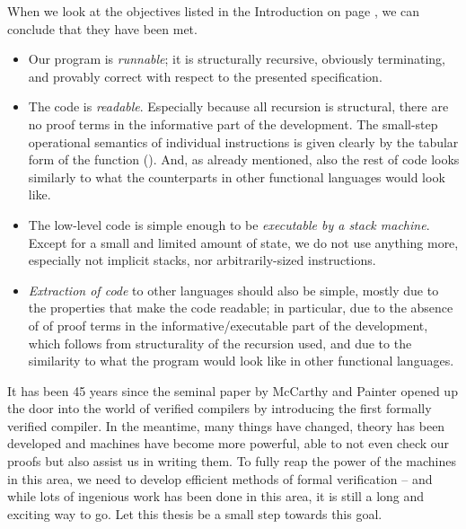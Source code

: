 When we look at the objectives listed in the Introduction on page \pageref{objectives},
we can conclude that they have been met.
\begin{itemize}
	\item Our program is \emph{runnable}; it is structurally recursive,
		obviously terminating, and provably correct with respect to the presented
		specification.
		
	\item The code is \emph{readable}. Especially because all recursion is structural,
		there are no proof terms in the
		informative part of the development. The small-step operational semantics
		of individual instructions is given clearly by the tabular form of the function
		 (). And, as already mentioned,
		also the rest of code looks similarly to what the counterparts in other functional
		languages would look like.
		
	\item The low-level code is simple enough to be \emph{executable by a stack machine}.
		Except for a small and limited amount of state, we do not use anything more,
		especially not implicit stacks, nor arbitrarily-sized instructions.
		
	\item \emph{Extraction of code} to other languages should also be simple, mostly due to
		the properties that make the code readable; in particular, due to the absence of
		of proof terms in the informative/executable part of the development, which follows
		from structurality of the recursion used, and due to the similarity to what
		the program would look like in other functional languages.
\end{itemize}

It has been 45 years since the seminal paper by McCarthy and Painter \cite{mccarthy67}
opened up the door into the world of verified compilers by introducing the first formally
verified compiler. In the meantime, many things have changed, theory has been developed and
machines have become more powerful, able to not even check our proofs but also assist us
in writing them. To fully reap the power of the machines in this area, we need to develop
efficient methods of formal verification -- and while lots of ingenious work has been
done in this area, it is still a long and exciting way to go. Let this thesis be a small
step towards this goal.

